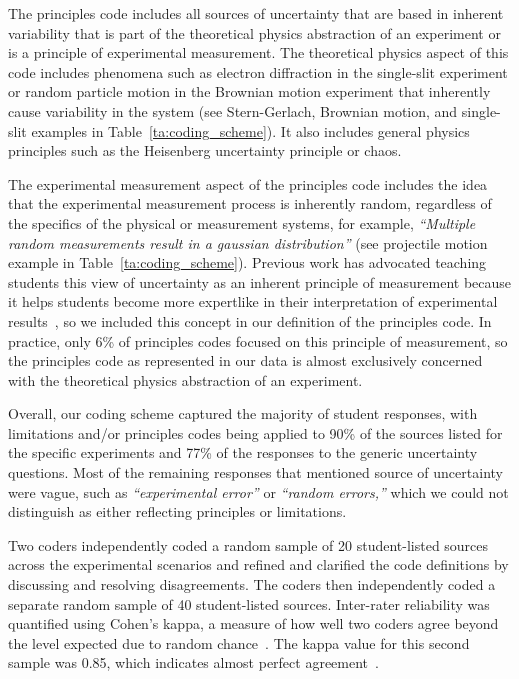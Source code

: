 \documentclass[english,aps,prstper,reprint,showpacs,longbibliography,superscriptaddress,nofootinbib]{revtex4-2}
\begin{document}
The principles code includes all sources of uncertainty that are based in inherent variability that is part of the theoretical physics abstraction of an experiment or is a principle of experimental measurement. The theoretical physics aspect of this code includes phenomena such as electron diffraction in the single-slit experiment or random particle motion in the Brownian motion experiment that inherently cause variability in the system (see Stern-Gerlach, Brownian motion, and single-slit examples in Table~\ref{ta:coding_scheme}). It also includes general physics principles such as the Heisenberg uncertainty principle or chaos. 

The experimental measurement aspect of the principles code includes the idea that the experimental measurement process is inherently random, regardless of the specifics of the physical or measurement systems, for example, \textit{``Multiple random measurements result in a gaussian distribution''} (see projectile motion example in Table~\ref{ta:coding_scheme}). Previous work has advocated teaching students this view of uncertainty as an inherent principle of measurement because it helps students become more expertlike in their interpretation of experimental results~\cite{Evangelinos1999,Evangelinos2002,Allie2003,Pillay2008,Buffler2008}, so we included this concept in our definition of the principles code. In practice, only 6\% of principles codes focused on this principle of measurement, so the principles code as represented in our data is almost exclusively concerned with the theoretical physics abstraction of an experiment.

Overall, our coding scheme captured the majority of student responses, with limitations and/or principles codes being applied to 90\% of the sources listed for the specific experiments and 77\% of the responses to the generic uncertainty questions. Most of the remaining responses that mentioned source of uncertainty were vague, such as \textit{``experimental error''} or \textit{``random errors,''} which we could not distinguish as either reflecting principles or limitations. 

Two coders independently coded a random sample of 20 student-listed sources across the experimental scenarios and refined and clarified the code definitions by discussing and resolving disagreements. The coders then independently coded a separate random sample of 40 student-listed sources. Inter-rater reliability was quantified using Cohen's kappa, a measure of how well two coders agree beyond the level expected due to random chance~\cite{Cohen1960}. The kappa value for this second sample was 0.85, which indicates almost perfect agreement~\cite{Landis1977}. 
\end{document}
